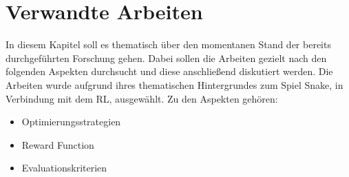 \chapter{Verwandte Arbeiten} \label{chap:Verwandte_Arbeiten}
In diesem Kapitel soll es thematisch über den momentanen Stand der bereits durchgeführten Forschung gehen. Dabei sollen die Arbeiten gezielt nach den folgenden Aspekten durchsucht und diese anschließend diskutiert werden. Die Arbeiten wurde aufgrund ihres thematischen Hintergrundes zum Spiel Snake, in Verbindung mit dem RL, ausgewählt. Zu den Aspekten gehören:
\begin{itemize}
	\item Optimierungsstrategien
	\item Reward Function
	\item Evaluationskriterien
\end{itemize}

